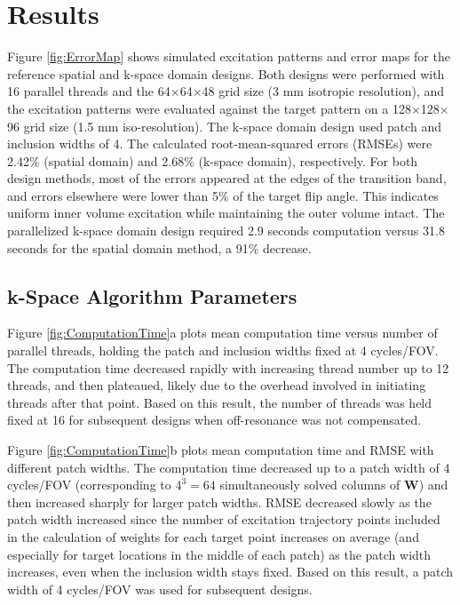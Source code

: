 \section*{Results}


Figure \ref{fig:ErrorMap} shows simulated excitation patterns and error maps for the reference spatial and k-space domain designs. 
Both designs were performed with 16 parallel threads and the 64$\times$64$\times$48 grid size (3 mm isotropic resolution), 
and the excitation patterns were evaluated against the target pattern on a 128$\times$128$\times$96 grid size (1.5 mm iso-resolution). 
The k-space domain design used patch and inclusion widths of 4.
The calculated root-mean-squared errors (RMSEs) were 2.42\% (spatial domain) and 2.68\% (k-space domain), 
respectively. 
For both design methods, most of the errors appeared at the edges of the transition band, 
and errors elsewhere were lower than 5\% of the target flip angle. 
This indicates uniform inner volume excitation while maintaining the outer volume intact. 
The parallelized k-space domain design required 2.9 seconds computation versus 31.8 seconds for the spatial domain method, a 91\% decrease.


\subsection*{k-Space Algorithm Parameters}
Figure \ref{fig:ComputationTime}a plots mean computation time versus number of parallel threads,
holding the patch and inclusion widths fixed at 4 cycles/FOV. 
The computation time decreased rapidly with increasing thread number up to 12 threads, 
and then plateaued, likely due to the overhead involved in initiating threads after that point.
Based on this result, the number of threads was held fixed at 16 for subsequent designs when off-resonance was not compensated.

\par Figure \ref{fig:ComputationTime}b plots mean computation time and RMSE with different patch widths. 
The computation time decreased up to a patch width of 4 cycles/FOV (corresponding to $4^3 = 64$ simultaneously solved columns of $\bm{W}$) 
and then increased sharply for larger patch widths. 
RMSE decreased slowly as the patch width increased since the number of excitation trajectory points included in the calculation of weights for each 
target point increases on average (and especially for target locations in the middle of each patch) as the patch width increases, 
even when the inclusion width stays fixed.
Based on this result, a patch width of 4 cycles/FOV was used for subsequent designs.

